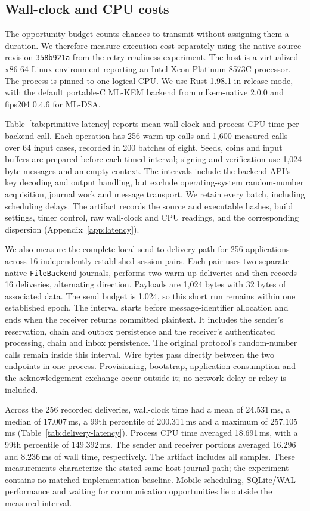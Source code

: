 \subsection{Wall-clock and CPU costs}
\label{sec:latency}

The opportunity budget counts chances to transmit without assigning them
a duration. We therefore measure execution cost separately using the native
source revision \texttt{358b921a} from the retry-readiness experiment.
The host is a virtualized x86-64 Linux environment reporting an Intel Xeon
Platinum 8573C processor. The process is pinned to one logical CPU. We use
Rust 1.98.1 in release mode, with the default portable-C ML-KEM backend
from mlkem-native 2.0.0 and fips204 0.4.6 for ML-DSA.

Table~\ref{tab:primitive-latency} reports mean wall-clock and process CPU
time per backend call. Each operation has 256 warm-up calls and 1,600
measured calls over 64 input cases, recorded in 200 batches of eight.
Seeds, coins and input buffers are prepared before each timed interval;
signing and verification use 1,024-byte messages and an empty context.
The intervals include the backend API's key decoding and output handling,
but exclude operating-system random-number acquisition, journal work and
message transport. We retain every batch, including scheduling delays.
The artifact records the source and executable hashes, build settings,
timer control, raw wall-clock and CPU readings, and the corresponding
dispersion (Appendix~\ref{app:latency}).



We also measure the complete local send-to-delivery path for 256
applications across 16 independently established session pairs. Each pair
uses two separate native \texttt{FileBackend} journals, performs two warm-up
deliveries and then records 16 deliveries, alternating direction. Payloads
are 1,024 bytes with 32 bytes of associated data. The send budget is 1,024,
so this short run remains within one established epoch.
The interval starts before message-identifier allocation and ends when the
receiver returns committed plaintext. It includes the sender's reservation,
chain and outbox persistence and the receiver's authenticated processing,
chain and inbox persistence. The original protocol's random-number calls
remain inside this interval. Wire bytes pass directly between the two
endpoints in one process. Provisioning, bootstrap, application consumption
and the acknowledgement exchange occur outside it; no network delay or
rekey is included.

Across the 256 recorded deliveries, wall-clock time had a mean of
24.531\,ms, a median of 17.007\,ms, a 99th percentile of 200.311\,ms
and a maximum of 257.105\,ms (Table~\ref{tab:delivery-latency}).
Process CPU time averaged 18.691\,ms, with a 99th percentile of
149.392\,ms. The sender and receiver portions averaged 16.296 and
8.236\,ms of wall time, respectively. The artifact includes all samples.
These measurements characterize the stated same-host journal path;
the experiment contains no matched implementation baseline. Mobile
scheduling, SQLite/WAL performance and waiting for communication
opportunities lie outside the measured interval.


